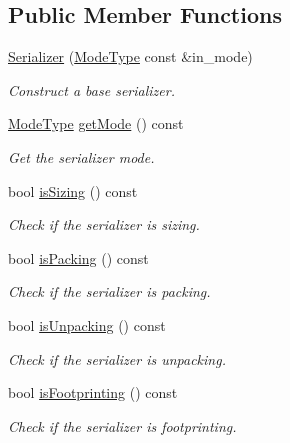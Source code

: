 \subsection*{Public Member Functions}
\begin{DoxyCompactItemize}
\item 
\hyperlink{structcheckpoint_1_1_serializer_a4007a463384ec96a4c21bd7f049f0be5}{Serializer} (\hyperlink{namespacecheckpoint_ae2509499ccd8b1dc48fb535bf8aa3059}{Mode\+Type} const \&in\+\_\+mode)
\begin{DoxyCompactList}\small\item\em Construct a base serializer. \end{DoxyCompactList}\item 
\hyperlink{namespacecheckpoint_ae2509499ccd8b1dc48fb535bf8aa3059}{Mode\+Type} \hyperlink{structcheckpoint_1_1_serializer_a2b22a87a81fb9ff1b00dd96bbe4debe2}{get\+Mode} () const
\begin{DoxyCompactList}\small\item\em Get the serializer mode. \end{DoxyCompactList}\item 
bool \hyperlink{structcheckpoint_1_1_serializer_a27e3304ca8c9de113675b7692e5aa65f}{is\+Sizing} () const
\begin{DoxyCompactList}\small\item\em Check if the serializer is sizing. \end{DoxyCompactList}\item 
bool \hyperlink{structcheckpoint_1_1_serializer_aee9d2701f508fff94bad836576443cd9}{is\+Packing} () const
\begin{DoxyCompactList}\small\item\em Check if the serializer is packing. \end{DoxyCompactList}\item 
bool \hyperlink{structcheckpoint_1_1_serializer_a3a09ea026ff2c6ddf863f9c1a6463466}{is\+Unpacking} () const
\begin{DoxyCompactList}\small\item\em Check if the serializer is unpacking. \end{DoxyCompactList}\item 
bool \hyperlink{structcheckpoint_1_1_serializer_a01f395bfaa39a8311925c71537877378}{is\+Footprinting} () const
\begin{DoxyCompactList}\small\item\em Check if the serializer is footprinting. \end{DoxyCompactList}\item 

\end{DoxyCompactItemize}
